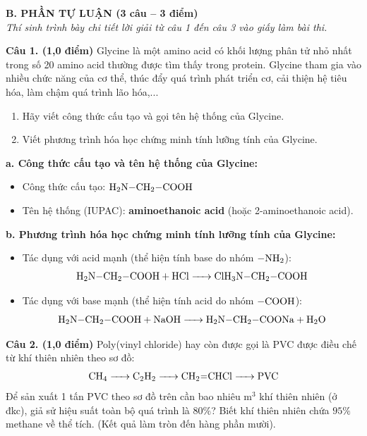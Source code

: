 \documentclass[11pt,a4paper]{article}
\begin{document}
\vspace{4pt}
\noindent
{\color{mainGreen}\textbf{\Large B. PHẦN TỰ LUẬN (3 câu – 3 điểm)}}\\
\textit{\small Thí sinh trình bày chi tiết lời giải từ câu 1 đến câu 3 vào giấy làm bài thi.}
\vspace{3pt}

\noindent
\textbf{Câu 1. (1,0 điểm)} Glycine là một amino acid có khối lượng phân tử nhỏ nhất trong số 20 amino acid thường được tìm thấy trong protein. Glycine tham gia vào nhiều chức năng của cơ thể, thúc đẩy quá trình phát triển cơ, cải thiện hệ tiêu hóa, làm chậm quá trình lão hóa,...
\begin{enumerate}[label=\alph*.,leftmargin=20pt,itemsep=1pt]
\item Hãy viết công thức cấu tạo và gọi tên hệ thống của Glycine.
\item Viết phương trình hóa học chứng minh tính lưỡng tính của Glycine.
\end{enumerate}

\begin{tcolorbox}[colback=tableGreen!30,colframe=mainGreen!70,title=\textbf{Hướng dẫn giải chi tiết Câu 1},fonttitle=\bfseries]
\textbf{a. Công thức cấu tạo và tên hệ thống của Glycine:}
\begin{itemize}[leftmargin=15pt,itemsep=1pt]
\item Công thức cấu tạo: $\ce{H2N-CH2-COOH}$
\item Tên hệ thống (IUPAC): \textbf{aminoethanoic acid} (hoặc 2-aminoethanoic acid).
\end{itemize}
\textbf{b. Phương trình hóa học chứng minh tính lưỡng tính của Glycine:}
\begin{itemize}[leftmargin=15pt,itemsep=1pt]
\item Tác dụng với acid mạnh (thể hiện tính base do nhóm $-\ce{NH2}$):
\[
\ce{H2N-CH2-COOH + HCl -> ClH3N-CH2-COOH}
\]
\item Tác dụng với base mạnh (thể hiện tính acid do nhóm $-\ce{COOH}$):
\[
\ce{H2N-CH2-COOH + NaOH -> H2N-CH2-COONa + H2O}
\]
\end{itemize}
\end{tcolorbox}

\vspace{2pt}
\noindent
\textbf{Câu 2. (1,0 điểm)} Poly(vinyl chloride) hay còn được gọi là PVC được điều chế từ khí thiên nhiên theo sơ đồ:
\[
\ce{CH4 -> C2H2 -> CH2=CHCl -> PVC}
\]
Để sản xuất 1 tấn PVC theo sơ đồ trên cần bao nhiêu $\text{m}^3$ khí thiên nhiên (ở đkc), giả sử hiệu suất toàn bộ quá trình là $80\%$? Biết khí thiên nhiên chứa $95\%$ methane về thể tích. (Kết quả làm tròn đến hàng phần mười).
\end{document}
